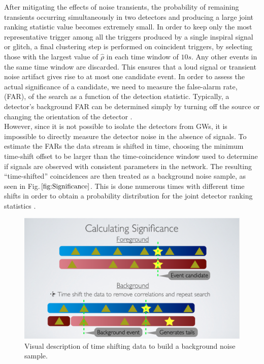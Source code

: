 \documentclass[binding=0.6cm, LaM]{sapthesis}
\begin{document}
	After mitigating the effects of noise transients, the probability of remaining transients 
	occurring simultaneously in two detectors and producing a large joint 
	ranking statistic value becomes extremely small.
	In order to keep only the most representative trigger among all the triggers produced by a single inspiral signal or glitch, 
	a final clustering step is performed on coincident triggers, 
	by selecting those with the largest value of $\hat \rho$ 
	in each time window of $10s$. 
	Any other events in the same time window are discarded. 
	This ensures that a loud signal or transient noise artifact gives rise to at most one candidate event.
	In order to assess the actual significance of a candidate, 
	we need to measure the false-alarm rate, (FAR), of the search as a function of the detection statistic.
	Typically, a detector’s background FAR can be determined 
	simply by turning off the source or changing the orientation of the detector \cite{13, 43}. \\ 
  	However, since it is not possible to isolate the detectors from GWs, 
	it is impossible to directly measure the detector noise in the absence of signals.
 	To estimate the FARs the data stream is shifted in time, 
	choosing the minimum time-shift offset to be larger than the time-coincidence window 
	used to determine if signals are observed with consistent parameters in the network.
	The resulting “time-shifted” coincidences are then treated as a background noise sample, as seen in Fig.$\ref{fig:Significance}$. 
	This is done numerous times with different time shifts in order to obtain 
	a probability distribution for the joint detector ranking statistics \cite{44}. 
		\begin{figure}[H]
			\includegraphics[scale=0.25]{Significance}
                  	\centering
                  	\caption{Visual description of time shifting data to build a background noise sample.}
                  	\label{fig:Significance}
                 \end{figure}
\end{document}
